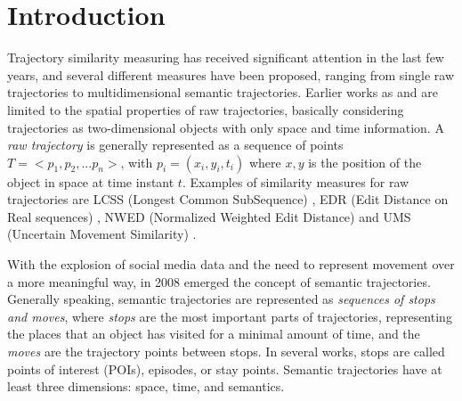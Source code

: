 \documentclass[12pt]{article}
\providecommand{\keywords}[1]
{
  \small    
  \textbf{\textit{Keywords---}} #1
}
\begin{document}
 




\section{Introduction}
Trajectory similarity measuring has received significant attention in the last few years, and several different measures have been proposed, ranging from single raw trajectories to multidimensional semantic trajectories. Earlier works as \cite{vlachos2002discovering} and \cite{Chen:2005:RFS:1066157.1066213} are limited to the spatial properties of raw trajectories, basically considering trajectories as two-dimensional objects with only space and time information. A \emph{raw trajectory} is generally represented as a sequence of points $T=<p_1, p_2, ...p_n>$, with $p_i=(x_i,y_i,t_i)$ where $x,y$ is the position of the object in space at time instant $t$. Examples of similarity measures for raw trajectories are LCSS (Longest Common SubSequence) \cite{vlachos2002discovering}, EDR (Edit Distance on Real sequences) \cite{Chen:2005:RFS:1066157.1066213}, NWED (Normalized Weighted Edit Distance) \cite{dodge2012} and UMS (Uncertain Movement Similarity) \cite{Furtado-UMS-2018}.

With the explosion of social media data and the need to represent movement over a more meaningful way, in 2008 emerged the concept of semantic trajectories\cite{Spaccapietra:2008:CVT:1347466.1347785}. Generally speaking, semantic trajectories are represented as \emph{sequences of stops and moves}, where \emph{stops} are the most important parts of trajectories, representing the places that an object has visited for a minimal amount of time, and the \emph{moves} are the trajectory points between stops. In several works, stops are called points of interest (POIs), episodes, or stay points. Semantic trajectories have at least three dimensions: space, time, and semantics.
\end{document}
